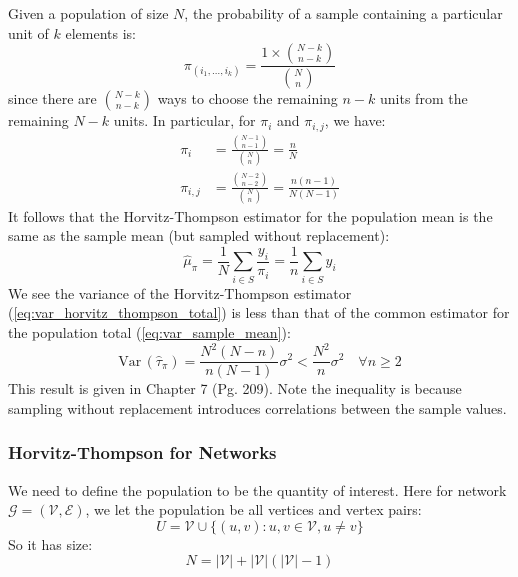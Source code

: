 \documentclass{article}
\begin{document}
\begin{example}\label{ex:srs}
   Given a population of size $N$, the probability of a sample containing a particular unit of $k$ elements is:
    \begin{equation*}
        \pi_{(i_1, \ldots, i_k)} = \frac{1 \times \binom{N-k}{n-k}}{\binom{N}{n}}
    \end{equation*}
    since there are $\binom{N-k}{n-k}$ ways to choose the remaining $n-k$ units from the remaining $N-k$ units.  
    In particular, for $\pi_i$ and $\pi_{i,j}$, we have:
    \begin{align*}
        \pi_i &= \frac{\binom{N-1}{n-1}}{\binom{N}{n}} = \frac{n}{N}\\
        \pi_{i,j} &= \frac{\binom{N-2}{n-2}}{\binom{N}{n}} = \frac{n(n-1)}{N(N-1)}
    \end{align*}
    It follows that the Horvitz-Thompson estimator for the population mean is the same as the sample mean (but sampled without replacement):
    \begin{equation*}
        \hat{\mu}_{\pi} = \frac{1}{N}\sum_{i\in S} \frac{y_i}{\pi_i} = \frac{1}{n}\sum_{i\in S} y_i
    \end{equation*}
    We see the variance of the Horvitz-Thompson estimator (\ref{eq:var_horvitz_thompson_total}) is less than that of the common estimator for the population total (\ref{eq:var_sample_mean}):
    \begin{equation*}
        \mathrm{Var}\,(\hat{\tau}_{\pi})=\frac{N^{2}(N-n)}{n(N-1)}\sigma^{2}<\frac{N^{2}}{n}\sigma^{2} \quad \forall n \geq 2
    \end{equation*}
    This result is given in \citep{alma990199486190107026} Chapter 7 (Pg. 209). Note the inequality is because sampling without replacement introduces correlations between the sample values.  
\end{example}

\subsubsection{Horvitz-Thompson for Networks}

We need to define the population to be the quantity of interest. Here for network ${\mathcal{G}}=(\mathcal{V},{\mathcal{E}})$, we let the population be all vertices and vertex pairs:
\begin{equation*}
    U=\mathcal{V}\cup \{(u,v):u,v\in \mathcal{V}, u\neq v\}
\end{equation*}
So it has size:
\begin{equation*}
    N=|\mathcal{V}|+|\mathcal{V}|(|\mathcal{V}|-1)
\end{equation*}
\end{document}
